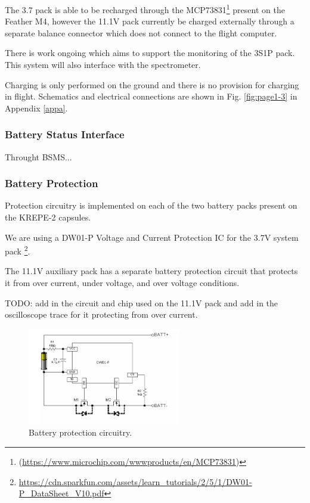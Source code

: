\documentclass{article}
\begin{document}
The 3.7 pack is able to be recharged through the MCP73831\footnote{ (\url{https://www.microchip.com/wwwproducts/en/MCP73831})} present on the Feather M4, however the 11.1V pack currently be charged externally through a separate balance connector which does not connect to the flight computer.  

There is work ongoing which aims to support the monitoring of the 3S1P pack. This system will also interface with the spectrometer. 

Charging is only performed on the ground and there is no provision for charging in flight. Schematics and electrical connections are shown in Fig. \ref{fig:page1-3} in Appendix \ref{appa}.

\subsubsection{Battery Status Interface}
Throught BSMS...

\subsubsection{Battery Protection}
Protection circuitry is implemented on each of the two battery packs present on the KREPE-2 capsules. 

 We are using a DW01-P Voltage and Current Protection IC for the 3.7V system pack  \footnote{\url{https://cdn.sparkfun.com/assets/learn_tutorials/2/5/1/DW01-P_DataSheet_V10.pdf}}.

The 11.1V auxiliary pack has a separate battery protection circuit that protects it from over current, under voltage, and over voltage conditions.

TODO: add in the circuit and chip used on the 11.1V pack and add in the oscilloscope trace for it protecting from over current. 

\begin{figure}[H]
	\centering
	\includegraphics[width=0.6\textwidth]{images/dw108.png}
	\caption{Battery protection circuitry.}
	\label{fig:bat-protec}
\end{figure}
\end{document}
